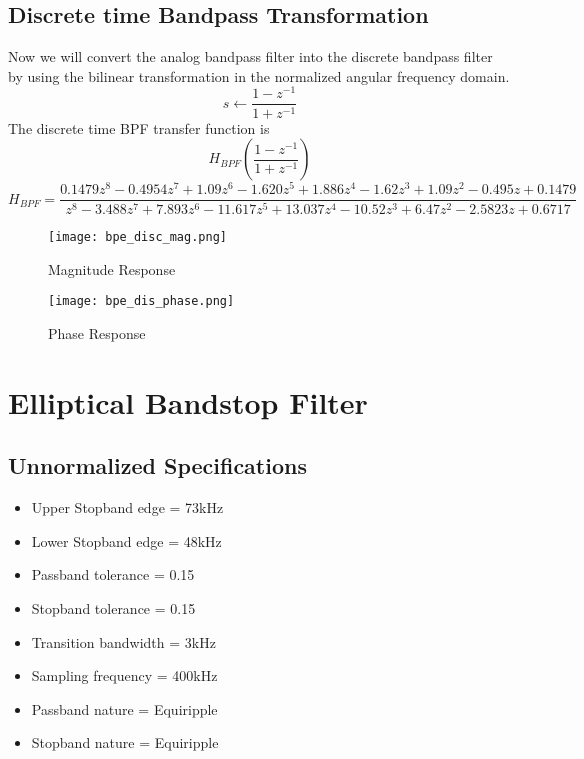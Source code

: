 \documentclass[12pt]{article}
\begin{document}
\subsection{\textbf{Discrete time Bandpass Transformation}}
Now we will convert the analog bandpass filter into the discrete bandpass filter by using the bilinear transformation in the normalized angular frequency domain.
\begin{equation*}
    s \longleftarrow \frac{1-z^{-1}}{1+z^{-1}}
\end{equation*}
The discrete time BPF transfer function is
\begin{equation*}
    H_{BPF}\left (\frac{1-z^{-1}}{1+z^{-1}}\right) 
\end{equation*}
\begin{equation*}
     H_{BPF} = \frac{0.1479z^8-0.4954z^7+1.09z^6-1.620z^5+1.886z^4-1.62z^3+1.09z^2-0.495z +0.1479}{z^8-3.488z^7+7.893z^6-11.617z^5+13.037z^4-10.52z^3+6.47z^2 -2.5823z+0.6717}
\end{equation*}
\begin{figure}[H]
\centering
\texttt{[image: bpe\_disc\_mag.png]}
\caption{Magnitude Response}
\label{fig:mesh2}
\end{figure}
\begin{figure}[H]
\centering
\texttt{[image: bpe\_dis\_phase.png]}
\caption{Phase Response}
\label{fig:mesh2}
\end{figure}
\section{Elliptical Bandstop Filter}
\subsection{\textbf{Unnormalized Specifications}}
\begin{itemize}
    \item Upper Stopband edge = 73kHz
    \item Lower Stopband edge = 48kHz
    \item Passband tolerance = 0.15
    \item Stopband tolerance = 0.15
    \item Transition bandwidth = 3kHz
    \item Sampling frequency = 400kHz
    \item Passband nature = Equiripple
    \item Stopband nature = Equiripple
\end{itemize}
\end{document}
